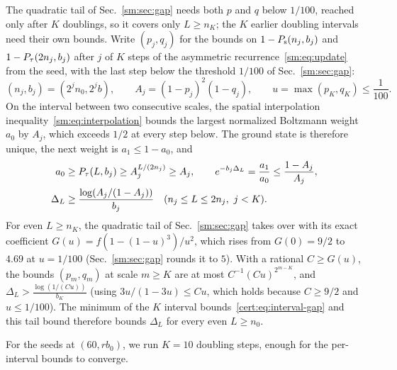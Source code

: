 The quadratic tail of Sec.~\ref{sm:sec:gap} needs both $p$ and $q$ below
$1/100$, reached only after $K$ doublings, so it covers only $L\ge n_K$;
the $K$ earlier doubling intervals need their own bounds.
Write $(p_j,q_j)$ for the bounds on $1-P_{\mathrm s}(n_j,b_j)$ and
$1-P_{\tau}(2n_j,b_j)$ after $j$ of $K$ steps of the
asymmetric recurrence~\eqref{sm:eq:update} from the seed, with the last
step below the threshold $1/100$ of Sec.~\ref{sm:sec:gap}:
\[
    (n_j,b_j)=(2^jn_0,2^jb),\qquad A_j=(1-p_j)^2(1-q_j),\qquad
    u=\max(p_K,q_K)\le\frac1{100}.
\]
On the interval between two consecutive scales, the spatial
interpolation inequality~\eqref{sm:eq:interpolation} bounds the largest
normalized Boltzmann weight $a_0$ by $A_j$, which exceeds $1/2$ at every
step below. The ground state is therefore unique, the next weight is
$a_1\le1-a_0$, and
\begin{align}
    a_0      &\ge P_{\tau}(L,b_j)\ge A_j^{L/(2n_j)}\ge A_j,\qquad
    e^{-b_j\Delta_L}=\frac{a_1}{a_0}\le\frac{1-A_j}{A_j},\notag\\
    \Delta_L &\ge\frac{\log(A_j/(1-A_j))}{b_j}
    \quad(n_j\le L\le2n_j,\ j<K).
    \label{cert:eq:interval-gap}
\end{align}
For even $L\ge n_K$, the quadratic tail of Sec.~\ref{sm:sec:gap} takes
over with its exact coefficient $G(u)=f(1-(1-u)^3)/u^2$, which rises from
$G(0)=9/2$ to $4.69$ at $u=1/100$ (Sec.~\ref{sm:sec:gap} rounds it to
$5$). With a rational $C\ge G(u)$, the bounds $(p_m,q_m)$ at scale $m\ge K$ are at
most $C^{-1}(Cu)^{2^{m-K}}$, and $\Delta_L>\tfrac{\log(1/(Cu))}{b_K}$ (using
$3u/(1-3u)\le Cu$, which holds because $C\ge9/2$ and $u\le1/100$). The
minimum of the $K$ interval bounds~\eqref{cert:eq:interval-gap} and this
tail bound therefore bounds $\Delta_L$ for every even $L\ge n_0$.

For the seeds at $(60,rb_0)$, we run $K=10$ doubling steps, enough for
the per-interval bounds to converge.

